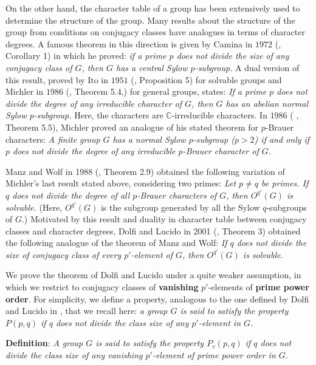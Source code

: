\documentclass[11pt, a4paper]{article}
\numberwithin{equation}{section}
\theoremstyle{plain} %
\begin{document}
On the other hand, the character table of a group has been extensively used to determine the structure of the group. Many results about the structure of the group from conditions on conjugacy classes have analogues in terms of character degrees. A famous theorem in this direction is given by Camina in $1972$ (\cite{MR294481}, Corollary 1) in which he proved: \textit{if a prime $p$ does not divide the size of any conjugacy class of $G$, then $G$ has a central Sylow $p$-subgroup.} A dual version of this result, proved by Ito in $1951$ (\cite{MR41852}, Proposition 5) for solvable groups and Michler in $1986$ (\cite{MR842482}, Theorem 5.4,) for general groups, states: \textit{If a prime $p$ does not divide the degree of any irreducible character of $G$, then $G$ has an abelian normal Sylow $p$-subgroup.} Here, the characters are $\mathbb{C}$-irreducible characters. In $1986$ ( \cite{MR842482}, Theorem 5.5), Michler proved an analogue of his stated theorem for $p$-Brauer characters: \textit{A finite group $G$  has a normal Sylow $p$-subgroup ($p>2$) if and only if $p$ does not divide the degree of any irreducible $p$-Brauer character of $G$.} 

Manz and Wolf in 1988 (\cite{MR937602}, Theorem 2.9) obtained the following variation of Michler's last result stated above, considering two primes: \textit{Let $p\neq q$ be primes. If $q$ does not divide the degree of all $p$-Brauer characters of $G$, then $O^{q'}(G)$ is solvable.} (Here, $O^{q'}(G)$ is the subgroup generated by all the Sylow $q$-subgroups of $G$.) Motivated by this result and duality in character table between conjugacy classes and character degrees, Dolfi and Lucido in 2001 (\cite{MR1826493}, Theorem 3) obtained the following analogue of the theorem of Manz and Wolf: \textit{If $q$ does not divide the size of conjugacy class of every $p'$-element of $G$, then $O^{q'}(G)$ is solvable}. 

We prove the theorem of Dolfi and Lucido under a quite weaker assumption, in which we restrict to conjugacy classes of \textbf{vanishing} $p'$-elements of \textbf{prime power order}. For simplicity, we define a property, analogous to the one defined by Dolfi and Lucido in \cite{MR1826493}, that we recall here: \textit{a group $G$ is said to satisfy the property $P(p,q)$ if $q$ does not divide the class size of any $p'$-element in $G$.}

\vskip5mm\noindent 
\textbf{Definition}:\textit{ A group $G$ is said to satisfy the property $P_{v}(p,q)$ if $q$ does not divide the class size of any vanishing $p'$-element of prime power order in $G$.}
\end{document}
